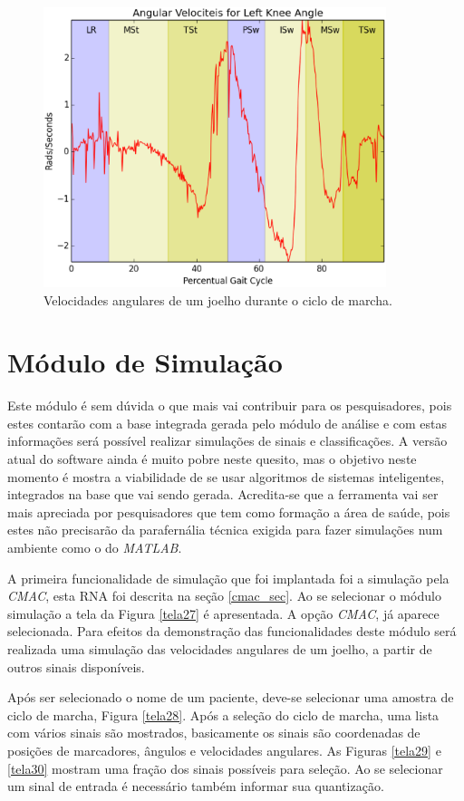\begin{figure}[ht]
	\centering
	\includegraphics[width=10cm]{figuras/tela26.eps}
	\caption{Velocidades angulares de um joelho durante o ciclo de marcha.}
\label{tela26}
\end{figure}





\goodbreak
\newpage
\clearpage
\section{Módulo de Simulação}
Este módulo é sem dúvida o que mais vai contribuir para os pesquisadores, pois estes contarão com a base integrada gerada pelo módulo de análise e com estas informações será possível realizar simulações de sinais e classificações. 
A versão atual do software ainda é muito pobre neste quesito, mas o objetivo neste momento é mostra a viabilidade de se usar algoritmos de sistemas inteligentes, integrados na base que vai sendo gerada.
Acredita-se que a ferramenta vai ser mais apreciada por pesquisadores que tem como formação a área de saúde, pois estes não precisarão da parafernália técnica exigida para fazer simulações num ambiente como o do \emph{MATLAB}.

A primeira funcionalidade de simulação que foi implantada foi a simulação pela \emph{CMAC}, esta RNA foi descrita na seção \ref{cmac_sec}. 
Ao se selecionar o módulo simulação a tela da Figura \ref{tela27} é apresentada. 
A opção \emph{CMAC}, já aparece selecionada. 
Para efeitos da demonstração das funcionalidades deste módulo será realizada uma simulação das velocidades angulares de um joelho, a partir de outros sinais disponíveis.

Após ser selecionado o nome de um paciente, deve-se selecionar uma amostra de ciclo de marcha, Figura \ref{tela28}.
Após a seleção do ciclo de marcha, uma lista com vários sinais são mostrados, basicamente os sinais são coordenadas de posições de marcadores, ângulos e velocidades angulares. As Figuras \ref{tela29} e \ref{tela30} mostram uma fração dos sinais possíveis para seleção. Ao se selecionar um sinal de entrada é necessário também informar sua quantização.


